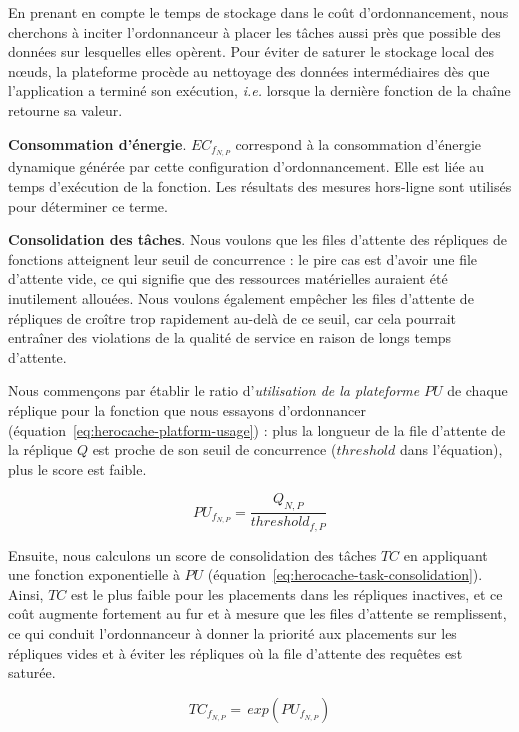En prenant en compte le temps de stockage dans le coût d'ordonnancement, nous cherchons à inciter l'ordonnanceur à placer les tâches aussi près que possible des données sur lesquelles elles opèrent. Pour éviter de saturer le stockage local des nœuds, la plateforme procède au nettoyage des données intermédiaires dès que l'application a terminé son exécution, \textit{i.e.} lorsque la dernière fonction de la chaîne retourne sa valeur.

\textbf{Consommation d'énergie}. ${EC}_{{f}_{N, P}}$ correspond à la consommation d'énergie dynamique générée par cette configuration d'ordonnancement. Elle est liée au temps d'exécution de la fonction. Les résultats des mesures hors-ligne sont utilisés pour déterminer ce terme.

\textbf{Consolidation des tâches}. Nous voulons que les files d'attente des répliques de fonctions atteignent leur seuil de concurrence : le pire cas est d'avoir une file d'attente vide, ce qui signifie que des ressources matérielles auraient été inutilement allouées. Nous voulons également empêcher les files d'attente de répliques de croître trop rapidement au-delà de ce seuil, car cela pourrait entraîner des violations de la qualité de service en raison de longs temps d'attente.

Nous commençons par établir le ratio d'\textit{utilisation de la plateforme} $PU$ de chaque réplique pour la fonction que nous essayons d'ordonnancer (équation~\ref{eq:herocache-platform-usage}) : plus la longueur de la file d'attente de la réplique $Q$ est proche de son seuil de concurrence ($threshold$ dans l'équation), plus le score est faible.

\begin{equation}
    PU_{f_{N, P}} = \frac{Q_{N, P}}{threshold_{f, P}}
\label{eq:herocache-platform-usage}
\end{equation}

Ensuite, nous calculons un score de consolidation des tâches $TC$ en appliquant une fonction exponentielle à $PU$ (équation~\ref{eq:herocache-task-consolidation}). Ainsi, $TC$ est le plus faible pour les placements dans les répliques inactives, et ce coût augmente fortement au fur et à mesure que les files d'attente se remplissent, ce qui conduit l'ordonnanceur à donner la priorité aux placements sur les répliques vides et à éviter les répliques où la file d'attente des requêtes est saturée.

\begin{equation}
    TC_{{f}_{N, P}} = \, exp(PU_{f_{N, P}})
\label{eq:herocache-task-consolidation}
\end{equation}

